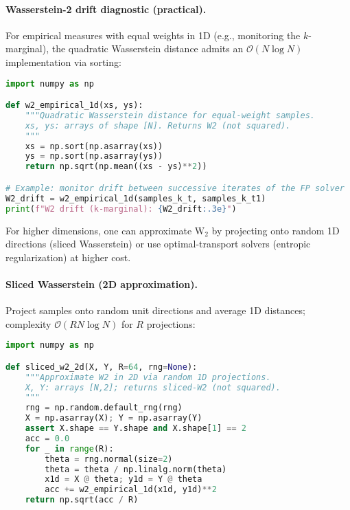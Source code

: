 ﻿\documentclass[11pt,letterpaper,oneside]{article}
\numberwithin{equation}{section}
\newcommand{\1}{\mathbf{1}}
\begin{document}
\paragraph{Wasserstein-2 drift diagnostic (practical).}
For empirical measures with equal weights in 1D (e.g., monitoring the $k$-marginal), the quadratic Wasserstein distance admits an $\mathcal O(N\log N)$ implementation via sorting:

\begin{lstlisting}[language=Python,caption={Empirical $\mathrm W_2$ in 1D via sorting (equal weights)}]
import numpy as np

def w2_empirical_1d(xs, ys):
    """Quadratic Wasserstein distance for equal-weight samples.
    xs, ys: arrays of shape [N]. Returns W2 (not squared).
    """
    xs = np.sort(np.asarray(xs))
    ys = np.sort(np.asarray(ys))
    return np.sqrt(np.mean((xs - ys)**2))

# Example: monitor drift between successive iterates of the FP solver
W2_drift = w2_empirical_1d(samples_k_t, samples_k_t1)
print(f"W2 drift (k-marginal): {W2_drift:.3e}")
\end{lstlisting}

For higher dimensions, one can approximate $\mathrm W_2$ by projecting onto random 1D directions (sliced Wasserstein) or use optimal-transport solvers (entropic regularization) at higher cost.

\paragraph{Sliced Wasserstein (2D approximation).}
Project samples onto random unit directions and average 1D distances; complexity $\mathcal O(R N\log N)$ for $R$ projections:

\begin{lstlisting}[language=Python,caption={Sliced $\mathrm W_2$ for 2D (equal weights)}]
import numpy as np

def sliced_w2_2d(X, Y, R=64, rng=None):
    """Approximate W2 in 2D via random 1D projections.
    X, Y: arrays [N,2]; returns sliced-W2 (not squared).
    """
    rng = np.random.default_rng(rng)
    X = np.asarray(X); Y = np.asarray(Y)
    assert X.shape == Y.shape and X.shape[1] == 2
    acc = 0.0
    for _ in range(R):
        theta = rng.normal(size=2)
        theta = theta / np.linalg.norm(theta)
        x1d = X @ theta; y1d = Y @ theta
        acc += w2_empirical_1d(x1d, y1d)**2
    return np.sqrt(acc / R)
\end{lstlisting}
\end{document}
